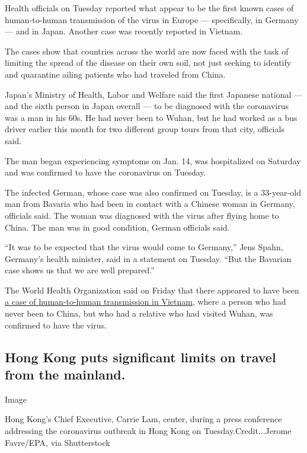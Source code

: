 Health officials on Tuesday reported what appear to be the first known
cases of human-to-human transmission of the virus in Europe ---
specifically, in Germany --- and in Japan. Another case was recently
reported in Vietnam.

The cases show that countries across the world are now faced with the
task of limiting the spread of the disease on their own soil, not just
seeking to identify and quarantine ailing patients who had traveled from
China.

Japan's Ministry of Health, Labor and Welfare said the first Japanese
national --- and the sixth person in Japan overall --- to be diagnosed
with the coronavirus was a man in his 60s. He had never been to Wuhan,
but he had worked as a bus driver earlier this month for two different
group tours from that city, officials said.

The man began experiencing symptoms on Jan. 14, was hospitalized on
Saturday and was confirmed to have the coronavirus on Tuesday.

The infected German, whose case was also confirmed on Tuesday, is a
33-year-old man from Bavaria who had been in contact with a Chinese
woman in Germany, officials said. The woman was diagnosed with the virus
after flying home to China. The man was in good condition, German
officials said.

``It was to be expected that the virus would come to Germany,'' Jens
Spahn, Germany's health minister, said in a statement on Tuesday. ``But
the Bavarian case shows us that we are well prepared.''

The World Health Organization said on Friday that there appeared to have
been
\href{https://www.who.int/docs/default-source/coronaviruse/situation-reports/20200124-sitrep-4-2019-ncov.pdf}{a
case of human-to-human transmission in Vietnam}, where a person who had
never been to China, but who had a relative who had visited Wuhan, was
confirmed to have the virus.

\hypertarget{hong-kong-puts-significant-limits-on-travel-from-the-mainland-}{%
\subsection{Hong Kong puts significant limits on travel from the
mainland.
}\label{hong-kong-puts-significant-limits-on-travel-from-the-mainland-}}

Image

Hong Kong's Chief Executive, Carrie Lam, center, during a press
conference addressing the coronavirus outbreak in Hong Kong on
Tuesday.Credit...Jerome Favre/EPA, via Shutterstock

